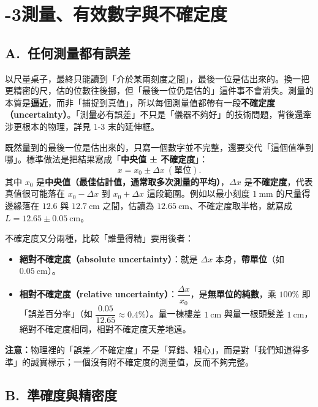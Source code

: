 \documentclass[11pt]{article}
\begin{document}
\section*{-3\quad 測量、有效數字與不確定度}

\subsection*{\sffamily A.\ 任何測量都有誤差}

以尺量桌子，最終只能讀到「介於某兩刻度之間」，最後一位是估出來的。換一把更精密的尺，估的位數往後挪，但「最後一位仍是估的」這件事不會消失。測量的本質是\textbf{逼近}，而非「捕捉到真值」，所以每個測量值都帶有一段\textbf{不確定度（uncertainty）}。「測量必有誤差」不只是「儀器不夠好」的技術問題，背後還牽涉更根本的物理，詳見 1-3 末的延伸框。

既然量到的最後一位是估出來的，只寫一個數字並不完整，還要交代「這個值準到哪」。標準做法是把結果寫成「\textbf{中央值 ± 不確定度}」：
$$x = x_0 \pm \Delta x\ (\text{單位}).$$
其中 $x_0$ 是\textbf{中央值（最佳估計值，通常取多次測量的平均）}，$\Delta x$ 是\textbf{不確定度}，代表真值很可能落在 $x_0-\Delta x$ 到 $x_0+\Delta x$ 這段範圍。例如以最小刻度 $1\ \text{mm}$ 的尺量得邊緣落在 $12.6$ 與 $12.7\ \text{cm}$ 之間，估讀為 $12.65\ \text{cm}$、不確定度取半格，就寫成 $L = 12.65 \pm 0.05\ \text{cm}$。


不確定度又分兩種，比較「誰量得精」要用後者：
\begin{itemize}\setlength{\itemsep}{1pt}
\item \textbf{絕對不確定度（absolute uncertainty）}：就是 $\Delta x$ 本身，\textbf{帶單位}（如 $0.05\ \text{cm}$）。
\item \textbf{相對不確定度（relative uncertainty）}：$\dfrac{\Delta x}{x_0}$，是\textbf{無單位的純數}，乘 $100\%$ 即「誤差百分率」（如 $\dfrac{0.05}{12.65}\approx0.4\%$）。量一棟樓差 $1\ \text{cm}$ 與量一根頭髮差 $1\ \text{cm}$，絕對不確定度相同，相對不確定度天差地遠。
\end{itemize}

\textbf{注意：}物理裡的「誤差／不確定度」不是「算錯、粗心」，而是對「我們知道得多準」的誠實標示；一個沒有附不確定度的測量值，反而不夠完整。

\subsection*{\sffamily B.\ 準確度與精密度}
\end{document}
